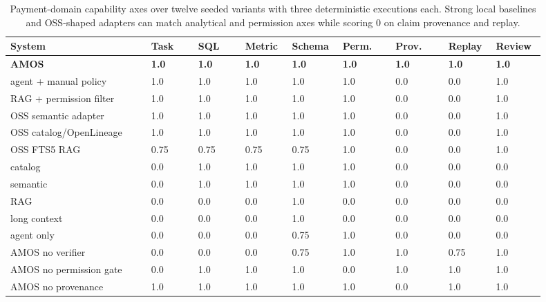 \documentclass[sigconf,nonacm]{acmart}
\newcommand{\amos}{\textsc{AMOS}\xspace}
\begin{document}
\begin{table}[p]
\centering
\scriptsize
\setlength{\tabcolsep}{2.2pt}
\begin{tabular}{L{0.24\linewidth}C{0.08\linewidth}C{0.08\linewidth}C{0.08\linewidth}C{0.08\linewidth}C{0.09\linewidth}C{0.09\linewidth}C{0.08\linewidth}C{0.08\linewidth}}
\toprule
\textbf{System} & \textbf{Task} & \textbf{SQL} & \textbf{Metric} & \textbf{Schema} & \textbf{Perm.} & \textbf{Prov.} & \textbf{Replay} & \textbf{Review} \\
\midrule
\textbf{\amos} & \textbf{1.0} & \textbf{1.0} & \textbf{1.0} & \textbf{1.0} & \textbf{1.0} & \textbf{1.0} & \textbf{1.0} & \textbf{1.0} \\
agent + manual policy & 1.0 & 1.0 & 1.0 & 1.0 & 1.0 & 0.0 & 0.0 & 1.0 \\
RAG + permission filter & 1.0 & 1.0 & 1.0 & 1.0 & 1.0 & 0.0 & 0.0 & 1.0 \\
OSS semantic adapter & 1.0 & 1.0 & 1.0 & 1.0 & 1.0 & 0.0 & 0.0 & 1.0 \\
OSS catalog/OpenLineage & 1.0 & 1.0 & 1.0 & 1.0 & 1.0 & 0.0 & 0.0 & 1.0 \\
OSS FTS5 RAG & 0.75 & 0.75 & 0.75 & 0.75 & 1.0 & 0.0 & 0.0 & 1.0 \\
catalog & 0.0 & 1.0 & 1.0 & 1.0 & 1.0 & 0.0 & 0.0 & 0.0 \\
semantic & 0.0 & 1.0 & 1.0 & 1.0 & 1.0 & 0.0 & 0.0 & 0.0 \\
RAG & 0.0 & 0.0 & 0.0 & 1.0 & 0.0 & 0.0 & 0.0 & 0.0 \\
long context & 0.0 & 0.0 & 0.0 & 1.0 & 0.0 & 0.0 & 0.0 & 0.0 \\
agent only & 0.0 & 0.0 & 0.0 & 0.75 & 1.0 & 0.0 & 0.0 & 0.0 \\
\amos no verifier & 0.0 & 0.0 & 0.0 & 0.75 & 1.0 & 1.0 & 0.75 & 1.0 \\
\amos no permission gate & 0.0 & 1.0 & 1.0 & 1.0 & 0.0 & 1.0 & 1.0 & 1.0 \\
\amos no provenance & 1.0 & 1.0 & 1.0 & 1.0 & 1.0 & 0.0 & 1.0 & 1.0 \\
\bottomrule
\end{tabular}
\caption{Payment-domain capability axes over twelve seeded variants with three deterministic executions each. Strong local baselines and OSS-shaped adapters can match analytical and permission axes while scoring 0 on claim provenance and replay.}
\label{tab:metric-axes}
\end{table}
\fi

\clearpage
\end{document}
